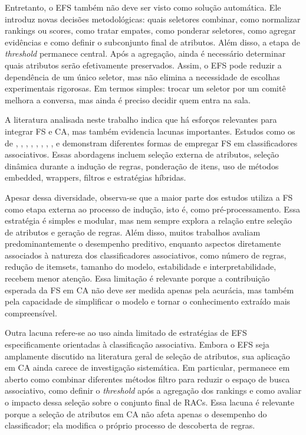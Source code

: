 Entretanto, o EFS também não deve ser visto como solução automática. Ele introduz novas decisões metodológicas: quais seletores combinar, como normalizar rankings ou scores, como tratar empates, como ponderar seletores, como agregar evidências e como definir o subconjunto final de atributos. Além disso, a etapa de \textit{threshold} permanece central. Após a agregação, ainda é necessário determinar quais atributos serão efetivamente preservados. Assim, o EFS pode reduzir a dependência de um único seletor, mas não elimina a necessidade de escolhas experimentais rigorosas. Em termos simples: trocar um seletor por um comitê melhora a conversa, mas ainda é preciso decidir quem entra na sala.

A literatura analisada neste trabalho indica que há esforços relevantes para integrar FS e CA, mas também evidencia lacunas importantes. Estudos como os de , , , , , , , ,  e  demonstram diferentes formas de empregar FS em classificadores associativos. Essas abordagens incluem seleção externa de atributos, seleção dinâmica durante a indução de regras, ponderação de itens, uso de métodos embedded, wrappers, filtros e estratégias híbridas.

Apesar dessa diversidade, observa-se que a maior parte dos estudos utiliza a FS como etapa externa ao processo de indução, isto é, como pré-processamento. Essa estratégia é simples e modular, mas nem sempre explora a relação entre seleção de atributos e geração de regras. Além disso, muitos trabalhos avaliam predominantemente o desempenho preditivo, enquanto aspectos diretamente associados à natureza dos classificadores associativos, como número de regras, redução de itemsets, tamanho do modelo, estabilidade e interpretabilidade, recebem menor atenção. Essa limitação é relevante porque a contribuição esperada da FS em CA não deve ser medida apenas pela acurácia, mas também pela capacidade de simplificar o modelo e tornar o conhecimento extraído mais compreensível.

Outra lacuna refere-se ao uso ainda limitado de estratégias de EFS especificamente orientadas à classificação associativa. Embora o EFS seja amplamente discutido na literatura geral de seleção de atributos, sua aplicação em CA ainda carece de investigação sistemática. Em particular, permanece em aberto como combinar diferentes métodos filtro para reduzir o espaço de busca associativo, como definir o \textit{threshold} após a agregação dos rankings e como avaliar o impacto dessa seleção sobre o conjunto final de RACs. Essa lacuna é relevante porque a seleção de atributos em CA não afeta apenas o desempenho do classificador; ela modifica o próprio processo de descoberta de regras.

